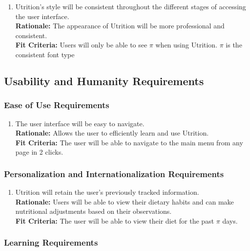 \documentclass[12pt]{article}
\begin{document}
{\begin{enumerate}[{LF}2. ]
	\item Utrition’s style will be consistent throughout the different stages of accessing the user interface.\\
	\textbf{Rationale:} The appearance of Utrition will be more professional and consistent. \\
	\textbf{Fit Criteria:} Users will only be able to see $\pi$ when using Utrition. $\pi$ is the consistent font type
\end{enumerate}

\subsection{Usability and Humanity Requirements}

\subsubsection{Ease of Use Requirements}

\begin{enumerate}[{UH}1. ]
	\item The user interface will be easy to navigate. \\
	\textbf{Rationale:} Allows the user to efficiently learn and use Utrition.\\
	\textbf{Fit Criteria:} The user will be able to navigate to the main menu from any page in 2 clicks.
\end{enumerate}

\subsubsection{Personalization and Internationalization Requirements}

\begin{enumerate}[{UH}2. ] 
	\item Utrition will retain the user’s previously tracked information.\\
	\textbf{Rationale:} Users will be able to view their dietary habits and can make nutritional adjustments based on their observations.\\
	\textbf{Fit Criteria:} The user will be able to view their diet for the past $\pi$ days.
	
\end{enumerate}

\subsubsection{Learning Requirements}

}
\end{document}

